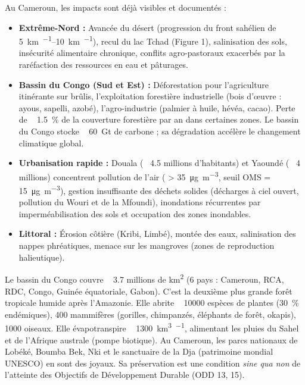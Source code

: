 \documentclass[11pt]{article}
\begin{document}
Au Cameroun, les impacts sont déjà visibles et documentés :
\begin{itemize}
    \item \textbf{Extrême-Nord :} Avancée du désert (progression du front sahélien de ~ \SIrange{5}{10}{\kilo\meter\per\an}), recul du lac Tchad (Figure 1), salinisation des sols, insécurité alimentaire chronique, conflits agro-pastoraux exacerbés par la raréfaction des ressources en eau et pâturages.
    \item \textbf{Bassin du Congo (Sud et Est) :} Déforestation pour l'agriculture itinérante sur brûlis, l'exploitation forestière industrielle (bois d'œuvre : ayous, sapelli, azobé), l'agro-industrie (palmier à huile, hévéa, cacao). Perte de ~ \SI{1,5}{\%} de la couverture forestière par an dans certaines zones. Le bassin du Congo stocke ~ \SI{60}{\giga\tonne} de carbone ; sa dégradation accélère le changement climatique global.
    \item \textbf{Urbanisation rapide :} Douala (~ \num{4,5} millions d'habitants) et Yaoundé (~ \num{4} millions) concentrent pollution de l'air ( > \SI{35}{\micro\gram\per\cubic\meter}, seuil OMS = \SI{15}{\micro\gram\per\cubic\meter}), gestion insuffisante des déchets solides (décharges à ciel ouvert, pollution du Wouri et de la Mfoundi), inondations récurrentes par imperméabilisation des sols et occupation des zones inondables.
    \item \textbf{Littoral :} Érosion côtière (Kribi, Limbé), montée des eaux, salinisation des nappes phréatiques, menace sur les mangroves (zones de reproduction halieutique).
\end{itemize}

\begin{savaistu}
Le bassin du Congo couvre ~ \num{3,7} millions de \si{\square\kilo\meter} (6 pays : Cameroun, RCA, RDC, Congo, Guinée équatoriale, Gabon). C'est la deuxième plus grande forêt tropicale humide après l'Amazonie. Elle abrite ~ \num{10000} espèces de plantes (\SI{30}{\%} endémiques), \num{400} mammifères (gorilles, chimpanzés, éléphants de forêt, okapis), \num{1000} oiseaux. Elle évapotranspire ~ \SI{1300}{\cubic\kilo\meter\per\an}, alimentant les pluies du Sahel et de l'Afrique australe (pompe biotique). Au Cameroun, les parcs nationaux de Lobéké, Boumba Bek, Nki et le sanctuaire de la Dja (patrimoine mondial UNESCO) en sont des joyaux. Sa préservation est une condition \emph{sine qua non} de l'atteinte des Objectifs de Développement Durable (ODD 13, 15).
\end{savaistu}
\end{document}
